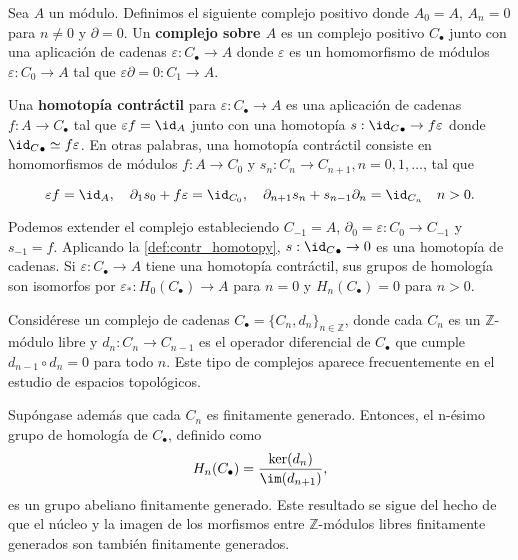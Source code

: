 \begin{definicion}
	Sea \(A\) un módulo. Definimos el siguiente complejo positivo donde \(A_{0} = A\),
	\(A_{n} = 0\) para \(n \neq 0\) y \(\partial = 0\). Un \textbf{complejo sobre \(A\)} es
	un complejo positivo \(C_{\bullet}\) junto con una aplicación de cadenas \(\varepsilon
	: C_{\bullet}\to A\) donde \(\varepsilon\) es un homomorfismo de módulos \(\varepsilon
	: C_{0} \to A\) tal que \(\varepsilon \partial = 0: C_{1} \to A\).
\end{definicion}

\begin{definicion}
	\label{def:contr_homotopy} Una \textbf{homotopía contráctil} para
	\(\varepsilon: C_{\bullet}\to A\) es una aplicación de cadenas
	\(f: A \to C_{\bullet}\) tal que \(\varepsilon f = \id_{A}\) junto con una
	homotopía \(s:{\id_C}_{\bullet}\rightarrow f \varepsilon\) donde
	\({\id_C}_{\bullet}\simeq f \varepsilon\). En otras palabras, una homotopía
	contráctil consiste en homomorfismos de módulos \(f: A \to C_{0}\) y
	\(s_{n}: C_{n} \to C_{n+1}, n = 0, 1, \ldots\), tal que
	
	\[
	\varepsilon f = \id_{A}, \quad \partial_{1}s_{0} + f \varepsilon = \id_{C_0},
	\quad \partial_{n+1}s_{n} + s_{n-1}\partial_{n} = \id_{C_n}\quad n > 0.
	\]
\end{definicion}

Podemos extender el complejo estableciendo \(C_{-1}= A\),
\(\partial_{0} = \varepsilon: C_{0} \to C_{-1}\) y \(s_{-1}= f\). Aplicando la \autoref{def:contr_homotopy},
\(s:{\id_C}_{\bullet}\rightarrow 0\) es una homotopía de cadenas. Si \(\varepsilon:
C_{\bullet}\to A\) tiene una homotopía contráctil, sus grupos de homología son
isomorfos por \(\varepsilon_{*}: H_{0}(C_{\bullet}) \rightarrow A\) para \(n = 0\) y
\(H_{n}(C_{\bullet}) = 0\) para \(n > 0\).

Considérese un complejo de cadenas
\(C_{\bullet}= \{ C_{n}, d_{n} \}_{n \in \mathbb{Z}}\), donde cada \(C_{n}\) es un \(\mathbb{Z}\)-módulo
libre y \(d_{n}: C_{n} \to C_{n-1}\) es el operador diferencial de \(C_{\bullet}\) que
cumple \(d_{n-1}\circ d_{n} = 0\) para todo \(n\). Este tipo de complejos aparece
frecuentemente en el estudio de espacios topológicos.

Supóngase además que cada \(C_{n}\) es finitamente generado. Entonces, el n-ésimo
grupo de homología de \(C_{\bullet}\), definido como
\[
H_{n}(C_{\bullet}) = \frac{\ker(d_{n})}{\im(d_{n+1})},
\]
es un grupo abeliano finitamente generado. Este resultado se sigue del hecho de
que el núcleo y la imagen de los morfismos entre \(\mathbb{Z}\)-módulos libres
finitamente generados son también finitamente generados.

